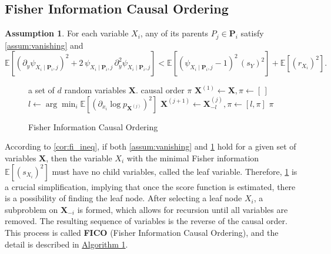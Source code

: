 \documentclass{article}
\theoremstyle{plain}
\theoremstyle{definition}
\newtheorem{assumption}[theorem]{Assumption}
\theoremstyle{remark}
\begin{document}
\subsection{Fisher Information Causal Ordering}

\begin{assumption}
\label{assum:fico_assum}
For each variable $X_i$, any of its parents $P_j\in\bm{P}_i$ satisfy \cref{assum:vanishing} and
\[\mathbb{E}\left[(\partial_{y}\psi_{X_i\mid\bm{P}_i,j})^2+2\,\psi_{X_i\mid\bm{P}_i,j}\,\partial^2_{y}\psi_{X_i\mid\bm{P}_i,j}\right]<\mathbb{E}\left[(\psi_{X_i\mid\bm{P}_i,j}-1)^2\,(s_Y)^2\right]+\mathbb{E}\left[(r_{X_i})^2\right].\]
\end{assumption}

\begin{figure}
    \centering
    \vspace{-1.3\baselineskip}
    \begin{minipage}{0.5\textwidth}
\begin{algorithm}[H]
\caption{Fisher Information Causal Ordering}
\begin{algorithmic}
    a set of $d$ random variables $\bm{X}$.
    causal order $\pi$
   \STATE $\bm{X}^{(1)}\gets\bm{X},\pi\gets[\,]$
        \STATE $l\gets\arg\min_i\mathbb{E}\left[\left(\partial_{x_i}\log p_{\bm{X}^{(j)}}\right)^2\right]$
        \STATE $\bm{X}^{(j+1)}\gets\bm{X}^{(j)}_{-l},\pi\gets[l,\pi]$
   \ENDFOR
    $\pi$
\end{algorithmic}
\end{algorithm}
    \end{minipage}
    \label{alg:fico}
\end{figure}%

According to \cref{cor:fi_ineq}, if both \cref{assum:vanishing} and \cref{assum:fico_assum} hold for a given set of variables $\bm{X}$, then the variable $X_i$ with the minimal Fisher information $\mathbb{E}[(s_{X_i})^2]$ must have no child variables, called the leaf variable. Therefore, \cref{assum:fico_assum} is a crucial simplification, implying that once the score function is estimated, there is a possibility of finding the leaf node. After selecting a leaf node $X_i$, a subproblem on $\bm{X}_{-i}$ is formed, which allows for recursion until all variables are removed. The resulting sequence of variables is the reverse of the causal order. This process is called \textbf{FICO} (Fisher Information Causal Ordering), and the detail is described in \hyperref[alg:fico]{Algorithm 1}.
\end{document}
